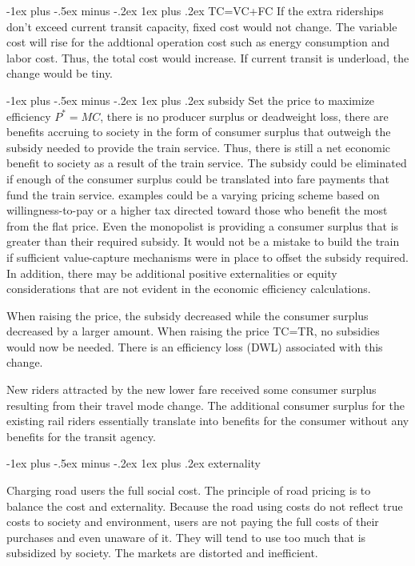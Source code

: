 \documentclass[10pt,portrait]{article}
\makeatletter
\renewcommand{\subsubsection}{\@startsection{subsubsection}{3}{0mm}%
                                {-1ex plus -.5ex minus -.2ex}%
                                {1ex plus .2ex}%
                                {\normalfont\small\bfseries}}
\makeatother
\begin{document}
\begin{multicols}{2}
\subsubsection{TC=VC+FC}
If the extra riderships don’t exceed current transit capacity, fixed cost would not change. The variable cost will rise for the addtional operation cost such as energy consumption and labor cost. Thus, the total cost would increase. If current transit is underload, the change would be tiny.

\subsubsection{subsidy}
Set the price to maximize efficiency $P^*=MC$, there is no producer surplus or deadweight loss, there are benefits accruing to society in the form of consumer surplus that outweigh the subsidy needed to provide the train service. Thus, there is still a net economic benefit to society as a result of the train service. The subsidy could be eliminated if enough of the consumer surplus could be translated into fare payments that fund the train service. examples could be a varying pricing scheme based on willingness-to-pay or a higher tax directed toward those who benefit the most from the flat price. Even the monopolist is providing a consumer surplus that is greater than their required subsidy. It would not be a mistake to build the train if sufficient value-capture mechanisms were in place to offset the subsidy required. In addition, there may be additional positive externalities or equity considerations that are not evident in the economic efficiency calculations.

When raising the price, the subsidy decreased while the consumer surplus decreased by a larger amount. When raising the price TC=TR, no subsidies would now be needed. There is an efficiency loss (DWL) associated with this change.

New riders attracted by the new lower fare received some consumer surplus resulting from their travel mode change. The additional consumer surplus for the existing rail riders essentially translate into benefits for the consumer without any benefits for the transit agency.

\subsubsection{externality}

Charging road users the full social cost. The principle of road pricing is to balance the cost and externality. Because the road using costs do not reflect true costs to society and environment, users are not paying the full costs of their purchases and even unaware of it. They will tend to use too much that is subsidized by society. The markets are distorted and inefficient.


\end{multicols}
\end{document}
